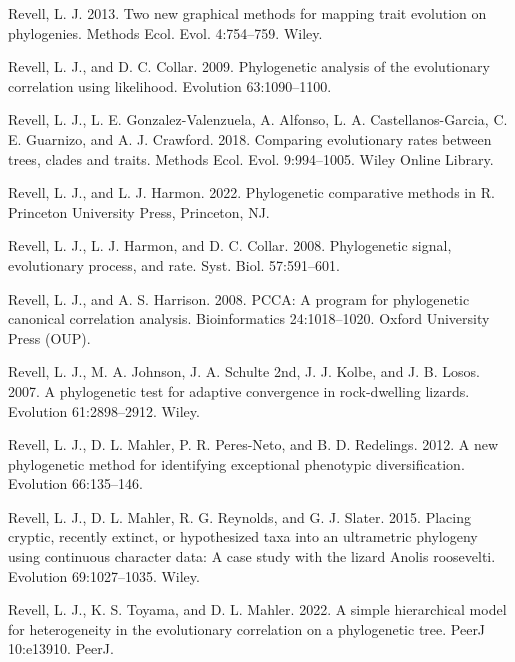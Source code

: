 \documentclass[fleqn,10pt,lineno]{wlpeerj} %
\newlength{\cslhangindent}
\newlength{\cslentryspacingunit} %
\newenvironment{CSLReferences}[2] %
 {%
  \setlength{\parindent}{0pt}
  \ifodd #1
  \let\oldpar\par
  \def\par{\hangindent=\cslhangindent\oldpar}
  \fi
  \setlength{\parskip}{#2\cslentryspacingunit}
 }%
 {}
\begin{document}
\begin{CSLReferences}{1}{0}
\leavevmode{}%
Revell, L. J. 2013. Two new graphical methods for mapping trait evolution on phylogenies. Methods Ecol. Evol. 4:754--759. Wiley.

\leavevmode{}%
Revell, L. J., and D. C. Collar. 2009. Phylogenetic analysis of the evolutionary correlation using likelihood. Evolution 63:1090--1100.

\leavevmode{}%
Revell, L. J., L. E. Gonzalez-Valenzuela, A. Alfonso, L. A. Castellanos-Garcia, C. E. Guarnizo, and A. J. Crawford. 2018. Comparing evolutionary rates between trees, clades and traits. Methods Ecol. Evol. 9:994--1005. Wiley Online Library.

\leavevmode{}%
Revell, L. J., and L. J. Harmon. 2022. Phylogenetic comparative methods in {R}. Princeton University Press, Princeton, NJ.

\leavevmode{}%
Revell, L. J., L. J. Harmon, and D. C. Collar. 2008. Phylogenetic signal, evolutionary process, and rate. Syst. Biol. 57:591--601.

\leavevmode{}%
Revell, L. J., and A. S. Harrison. 2008. {PCCA}: A program for phylogenetic canonical correlation analysis. Bioinformatics 24:1018--1020. Oxford University Press (OUP).

\leavevmode{}%
Revell, L. J., M. A. Johnson, J. A. Schulte 2nd, J. J. Kolbe, and J. B. Losos. 2007. A phylogenetic test for adaptive convergence in rock-dwelling lizards. Evolution 61:2898--2912. Wiley.

\leavevmode{}%
Revell, L. J., D. L. Mahler, P. R. Peres-Neto, and B. D. Redelings. 2012. A new phylogenetic method for identifying exceptional phenotypic diversification. Evolution 66:135--146.

\leavevmode{}%
Revell, L. J., D. L. Mahler, R. G. Reynolds, and G. J. Slater. 2015. Placing cryptic, recently extinct, or hypothesized taxa into an ultrametric phylogeny using continuous character data: A case study with the lizard {Anolis} roosevelti. Evolution 69:1027--1035. Wiley.

\leavevmode{}%
Revell, L. J., K. S. Toyama, and D. L. Mahler. 2022. A simple hierarchical model for heterogeneity in the evolutionary correlation on a phylogenetic tree. PeerJ 10:e13910. PeerJ.


\end{CSLReferences}
\end{document}
